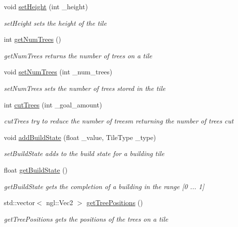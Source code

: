 \begin{DoxyCompactItemize}
void \hyperlink{class_grid_tile_ade3a37f993cb0e0aa28a93df6a2d7c03}{set\+Height} (int \+\_\+height)
\begin{DoxyCompactList}\small\item\em set\+Height sets the height of the tile \end{DoxyCompactList}\item 
int \hyperlink{class_grid_tile_a7519797658aedf4c3a5593eef2c8612e}{get\+Num\+Trees} ()
\begin{DoxyCompactList}\small\item\em get\+Num\+Trees returns the number of trees on a tile \end{DoxyCompactList}\item 
void \hyperlink{class_grid_tile_a1a5b16033129e696a04d1158afd30f4a}{set\+Num\+Trees} (int \+\_\+num\+\_\+trees)
\begin{DoxyCompactList}\small\item\em set\+Num\+Trees sets the number of trees stored in the tile \end{DoxyCompactList}\item 
int \hyperlink{class_grid_tile_a372058d00e9573715a07914e086f98ae}{cut\+Trees} (int \+\_\+goal\+\_\+amount)
\begin{DoxyCompactList}\small\item\em cut\+Trees try to reduce the number of treesm returning the number of trees cut \end{DoxyCompactList}\item 
void \hyperlink{class_grid_tile_af474b1185c91d6b9edc19e456a7227e9}{add\+Build\+State} (float \+\_\+value, Tile\+Type \+\_\+type)
\begin{DoxyCompactList}\small\item\em set\+Build\+State adds to the build state for a building tile \end{DoxyCompactList}\item 
float \hyperlink{class_grid_tile_abf2c072dd742f3f1581c399d27db6077}{get\+Build\+State} ()
\begin{DoxyCompactList}\small\item\em get\+Build\+State gets the completion of a building in the range \mbox{[}0 ... 1\mbox{]} \end{DoxyCompactList}\item 
std\+::vector$<$ ngl\+::\+Vec2 $>$ \hyperlink{class_grid_tile_a3e964d7cefe5b100ae9f15326a2eecbd}{get\+Tree\+Positions} ()
\begin{DoxyCompactList}\small\item\em get\+Tree\+Positions gets the positions of the trees on a tile \end{DoxyCompactList}\end{DoxyCompactItemize}


